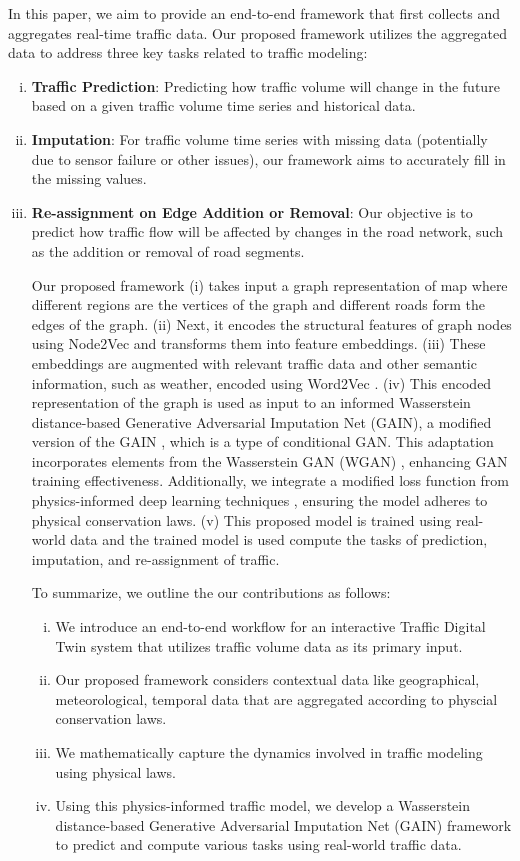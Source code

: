 In this paper, we aim to provide an end-to-end framework that first collects and aggregates real-time traffic data. Our proposed framework utilizes the aggregated data to address three key tasks related to traffic modeling:
\begin{enumerate}[(i)]
\item \textbf{Traffic Prediction}: Predicting how traffic volume will change in the future based on a given traffic volume time series and historical data.
\item \textbf{Imputation}: For traffic volume time series with missing data (potentially due to sensor failure or other issues), our framework aims to accurately fill in the missing values.
\item \textbf{Re-assignment on Edge Addition or Removal}: Our objective is to predict how traffic flow will be affected by changes in the road network, such as the addition or removal of road segments.

Our proposed framework (i) takes input a graph representation of map where different regions are the vertices of the graph and different roads form the edges of the graph. (ii) Next, it encodes the structural features of graph nodes using Node2Vec \cite{node2vec} and  transforms them into feature embeddings. (iii) These embeddings are augmented with relevant traffic data and other semantic information, such as weather, encoded using Word2Vec \cite{word2vec}.
(iv) This encoded representation of the graph is used as input to an informed Wasserstein distance-based Generative Adversarial Imputation Net (GAIN), a modified version of the GAIN \cite{gain}, which is a type of conditional GAN. This adaptation incorporates elements from the Wasserstein GAN (WGAN) \cite{wgan}, enhancing GAN training effectiveness. Additionally, we integrate a modified loss function from physics-informed deep learning techniques \cite{pidl}, ensuring the model adheres to physical conservation laws.
(v) This proposed model is trained using real-world data and the trained model is used compute the tasks of prediction, imputation, and re-assignment of traffic.

To summarize, we outline the our contributions as follows:

\begin{enumerate}[(i)]
\item We introduce an end-to-end workflow for an interactive Traffic Digital Twin system that utilizes traffic volume data as its primary input.
\item Our proposed framework considers contextual data like geographical, meteorological, temporal data that are aggregated according to physcial conservation laws.
\item We mathematically capture the dynamics involved in traffic modeling using physical laws.
\item Using this physics-informed traffic model, we develop a Wasserstein distance-based Generative Adversarial Imputation Net (GAIN) framework to predict and compute various tasks using real-world traffic data.


\end{enumerate}
\end{enumerate}
